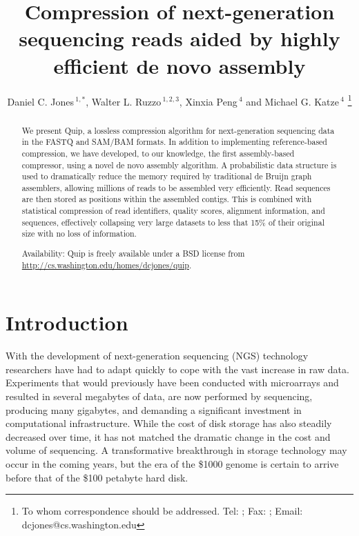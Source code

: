 \documentclass[a4,center,fleqn]{NAR}
\begin{document}
\title{Compression of next-generation sequencing reads aided by highly efficient de novo assembly}

\author{%
Daniel C. Jones\,$^{1,*}$,
Walter L. Ruzzo\,$^{1,2,3}$,
Xinxia Peng\,$^{4}$
and Michael G. Katze\,$^{4}$%
\footnote{To whom correspondence should be addressed.
Tel: ; Fax: ; Email: dcjones@cs.washington.edu}}


\address{
$^{1}$Department of Computer Science and Engineering,
University of Washington, Seattle, WA 98195-2350, USA
$^{2}$Department of Genome Sciences, University of Washington, Seattle, WA
98195-5065, USA
$^{3}$Fred Hutchinson Cancer Research Center, Seattle, WA 98109, USA
$^{4}$Department of Microbiology, University of Washington, Seattle, WA
98195-7242, USA
}

\history{}

\maketitle

\begin{abstract}
We present Quip, a lossless compression algorithm for next-generation
sequencing data in the FASTQ and SAM/BAM formats. In addition to implementing
reference-based compression, we have developed, to our knowledge, the first
assembly-based compressor, using a novel de novo assembly algorithm. A
probabilistic data structure is used to dramatically reduce the memory
required by traditional de Bruijn graph assemblers, allowing millions of reads
to be assembled very efficiently. Read sequences are then stored as positions
within the assembled contigs. This is combined with statistical compression of
read identifiers, quality scores, alignment information, and sequences,
effectively collapsing very large datasets to less that 15\% of their original
size with no loss of information.

Availability: Quip is freely available under a BSD license from
\url{http://cs.washington.edu/homes/dcjones/quip}.
\end{abstract}

\section{Introduction}

With the development of next-generation sequencing (NGS) technology
researchers have had to adapt quickly to cope with the vast increase in raw
data. Experiments that would previously have been conducted with microarrays
and resulted in several megabytes of data, are now performed by sequencing,
producing many gigabytes, and demanding a significant investment in
computational infrastructure. While the cost of disk storage has also steadily
decreased over time, it has not matched the dramatic change in the cost and
volume of sequencing. A transformative breakthrough in storage technology may
occur in the coming years, but the era of the \$1000 genome is certain to
arrive before that of the \$100 petabyte hard disk.
\end{document}
